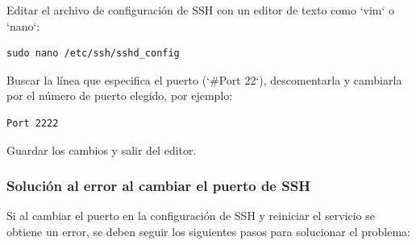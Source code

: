 Editar el archivo de configuración de SSH con un editor de texto como `vim` o `nano`:

\begin{lstlisting}[style=mystyle]
sudo nano /etc/ssh/sshd_config
\end{lstlisting}

Buscar la línea que especifica el puerto (`\#Port 22`), descomentarla y cambiarla por el número de puerto elegido, por ejemplo:

\begin{lstlisting}[style=mystyle]
Port 2222
\end{lstlisting}

Guardar los cambios y salir del editor.

\subsubsection{Solución al error al cambiar el puerto de SSH}

Si al cambiar el puerto en la configuración de SSH y reiniciar el servicio se obtiene un error, se deben seguir los siguientes pasos para solucionar el problema:

